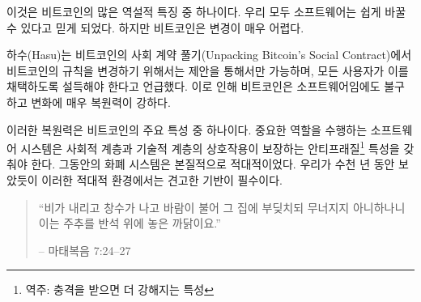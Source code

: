 \begin{comment}
	This is one of the many paradoxical properties of Bitcoin. We all came
	to believe that anything which is software can be changed easily. But
	the nature of the beast makes changing it bloody hard.
\end{comment}
이것은 비트코인의 많은 역설적 특징 중 하나이다.
우리 모두 소프트웨어는 쉽게 바꿀 수 있다고 믿게 되었다.
하지만 비트코인은 변경이 매우 어렵다. 
	
\begin{comment}
	As Hasu beautifully shows in Unpacking Bitcoin's Social
	Contract~\cite{social-contract}, changing the rules of Bitcoin is only possible
	by \textit{proposing} a change, and consequently \textit{convincing} all users
	of Bitcoin to adopt this change. This makes Bitcoin very resilient to change,
	even though it is software.
\end{comment}
하수(Hasu)는 비트코인의 사회 계약 풀기(Unpacking Bitcoin's Social Contract)\cite{social-contract}에서
비트코인의 규칙을 변경하기 위해서는 제안을 통해서만 가능하며, 모든 사용자가 이를 채택하도록 설득해야 한다고 언급했다.
이로 인해 비트코인은 소프트웨어임에도 불구하고 변화에 매우 복원력이 강하다.

\begin{comment}
	This resilience is one of the most important properties of Bitcoin.
	Critical software systems have to be antifragile, which is what the
	interplay of Bitcoin's social layer and its technical layer guarantees.
	Monetary systems are adversarial by nature, and as we have known for
	thousands of years solid foundations are essential in an adversarial
	environment.
\end{comment}
이러한 복원력은 비트코인의 주요 특성 중 하나이다.
중요한 역할을 수행하는 소프트웨어 시스템은 사회적 계층과 기술적 계층의 상호작용이 보장하는 
안티프래질\footnote{역주: 충격을 받으면 더 강해지는 특성} 특성을 갖춰야 한다.
그동안의 화폐 시스템은 본질적으로 적대적이었다.
우리가 수천 년 동안 보았듯이 이러한 적대적 환경에서는 견고한 기반이 필수이다.
	
\begin{quotation}\begin{samepage}
	\begin{comment}
		\enquote{The rain came down, the floods came, and the winds blew, and beat on
			that house; and it didn't fall, for it was founded on the rock.}
		\begin{flushright} -- Matthew 7:24--27
		\end{comment}
		\enquote{비가 내리고 창수가 나고 바람이 불어 그 집에 부딪치되 무너지지 아니하나니 이는 주추를 반석 위에 놓은 까닭이요.}
		\begin{flushright} -- 마태복음 7:24--27
\end{flushright}\end{samepage}\end{quotation}
		
